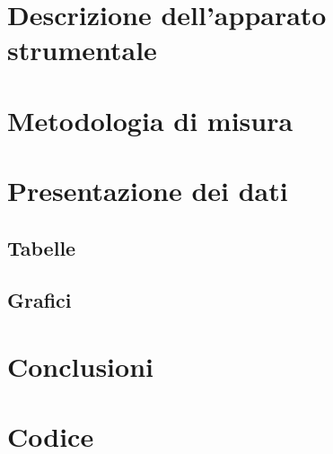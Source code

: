 \documentclass[10pt,a4paper]{article} %
\begin{document}
\maketitle %

\tableofcontents %

\begin{abstract}
	
\end{abstract}

\section{Descrizione dell'apparato strumentale}
	

\section{Metodologia di misura}
	

\newpage
\section{Presentazione dei dati}			
	\subsection{Tabelle}
	
	
	\clearpage
	\subsection{Grafici}
	
		
\section{Conclusioni}
	
	
\section{Codice}
	
	
\end{document}
